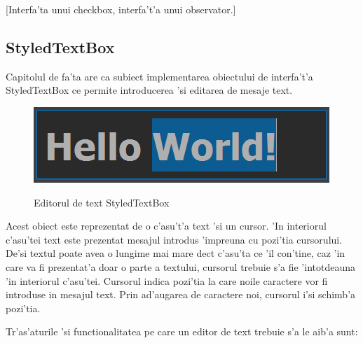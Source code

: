 [Interfa'ta unui checkbox, interfa't'a unui observator.]


\subsection{StyledTextBox}

Capitolul de fa'ta are ca subiect implementarea obiectului de interfa't'a StyledTextBox ce permite introducerea 'si editarea de mesaje text. 

\begin{center}
\begin{figure}[h]
    \centering
    \includegraphics{img/ch5_styledtextbox.png}
    \label{fig:fig_5_1}
    \caption{Editorul de text StyledTextBox}
\end{figure}
\end{center}

\medskip

Acest obiect este reprezentat de o c'asu't'a text 'si un cursor. 'In interiorul c'asu'tei text este prezentat mesajul introdus 'impreuna cu pozi'tia cursorului. De'si textul poate avea o lungime mai mare dec{\ia}t c'asu'ta ce 'il con'tine, caz 'in care va fi prezentat'a doar o parte a textului, cursorul trebuie s'a fie 'intotdeauna 'in interiorul c'asu'tei. Cursorul indica pozi'tia la care noile caractere vor fi introduse in mesajul text. Prin ad'augarea de caractere noi, cursorul i'si schimb'a pozi'tia.

\medskip

Tr'as'aturile 'si functionalitatea pe care un editor de text trebuie s'a le aib'a sunt:

